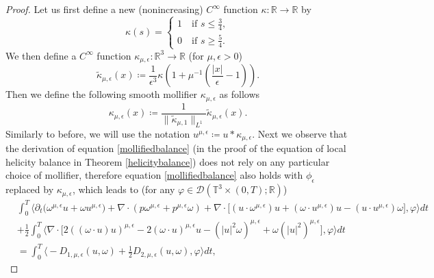 \documentclass[12pt,a4paper]{article}
\theoremstyle{definition}
\theoremstyle{remark}
\numberwithin{equation}{section}
\begin{document}
\begin{proof}
Let us first define a new (nonincreasing) $C^\infty$ function $\kappa: \mathbb{R} \rightarrow \mathbb{R}$ by
\begin{equation*}
\kappa (s) = \begin{cases}
1 \quad \text{if } s \leq \frac{3}{4}, \\
0 \quad \text{if } s \geq \frac{5}{4}.
\end{cases}
\end{equation*}
We then define a $C^\infty$ function $\kappa_{\mu,\epsilon}: \mathbb{R}^3 \rightarrow \mathbb{R}$ (for $\mu, \epsilon > 0$)
\begin{equation*}
\widetilde{\kappa}_{\mu,\epsilon} (x) \coloneqq \frac{1}{\epsilon^3 } \kappa \left( 1 + \mu^{-1} \left(\frac{\lvert x \rvert}{\epsilon} -1 \right) \right).
\end{equation*}
Then we define the following smooth mollifier $\kappa_{\mu,\epsilon}$ as follows
\begin{equation*}
\kappa_{\mu,\epsilon} (x) \coloneqq \frac{1}{\lVert \widetilde{\kappa}_{\mu,1} \rVert_{L^1}} \widetilde{\kappa}_{\mu,\epsilon} (x).
\end{equation*}
Similarly to before, we will use the notation $u^{\mu,\epsilon} \coloneqq u * \kappa_{\mu,\epsilon}$. Next we observe that the derivation of equation \eqref{mollifiedbalance} (in the proof of the equation of local helicity balance in Theorem \ref{helicitybalance}) does not rely on any particular choice of mollifier, therefore equation \eqref{mollifiedbalance} also holds with $\phi_\epsilon$ replaced by $\kappa_{\mu,\epsilon}$, which leads to (for any $\varphi \in \mathcal{D} (\mathbb{T}^3 \times (0,T);\mathbb{R})$)
\begin{align}
&\int_0^T \bigg\langle \partial_t \big( \omega^{\mu,\epsilon} u + \omega u^{\mu,\epsilon} \big) + \nabla \cdot (p \omega^{\mu,\epsilon} + p^{\mu,\epsilon} \omega) + \nabla \cdot \big[ (u \cdot \omega^{\mu,\epsilon}) u + (\omega \cdot u^{\mu,\epsilon}) u - (u \cdot u^{\mu,\epsilon}) \omega \big], \varphi \bigg\rangle dt \nonumber \\
&+ \frac{1}{2} \int_0^T \bigg\langle \nabla \cdot \big[ 2((\omega \cdot u) u)^{\mu,\epsilon} - 2(\omega \cdot u)^{\mu,\epsilon} u - ( \lvert u \rvert^2 \omega)^{\mu,\epsilon} + \omega (\lvert u \rvert^2)^{\mu,\epsilon} \big], \varphi \bigg\rangle dt \nonumber \\
&= \int_0^T \bigg\langle - D_{1,\mu,\epsilon} (u, \omega) + \frac{1}{2} D_{2,\mu,\epsilon} (u, \omega) ,  \varphi \bigg\rangle dt, \label{mollifiedsphericalbalance}

\end{align}
\end{proof}
\end{document}
